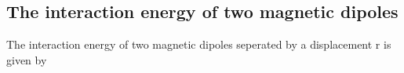 \subsection{The interaction energy of two magnetic dipoles}
The interaction energy of two magnetic dipoles seperated by a displacement r is given by\\
\begin{center}
\end{center} 
